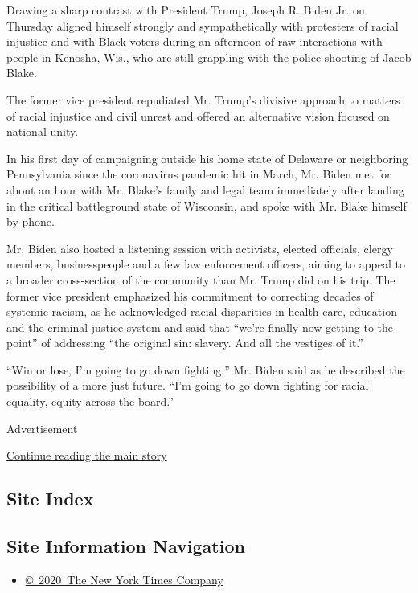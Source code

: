 Drawing a sharp contrast with President Trump, Joseph R. Biden Jr. on
Thursday aligned himself strongly and sympathetically with protesters of
racial injustice and with Black voters during an afternoon of raw
interactions with people in Kenosha, Wis., who are still grappling with
the police shooting of Jacob Blake.

The former vice president repudiated Mr. Trump's divisive approach to
matters of racial injustice and civil unrest and offered an alternative
vision focused on national unity.

In his first day of campaigning outside his home state of Delaware or
neighboring Pennsylvania since the coronavirus pandemic hit in March,
Mr. Biden met for about an hour with Mr. Blake's family and legal team
immediately after landing in the critical battleground state of
Wisconsin, and spoke with Mr. Blake himself by phone.

Mr. Biden also hosted a listening session with activists, elected
officials, clergy members, businesspeople and a few law enforcement
officers, aiming to appeal to a broader cross-section of the community
than Mr. Trump did on his trip. The former vice president emphasized his
commitment to correcting decades of systemic racism, as he acknowledged
racial disparities in health care, education and the criminal justice
system and said that ``we're finally now getting to the point'' of
addressing ``the original sin: slavery. And all the vestiges of it.''

``Win or lose, I'm going to go down fighting,'' Mr. Biden said as he
described the possibility of a more just future. ``I'm going to go down
fighting for racial equality, equity across the board.''

Advertisement

\protect\hyperlink{after-bottom}{Continue reading the main story}

\hypertarget{site-index}{%
\subsection{Site Index}\label{site-index}}

\hypertarget{site-information-navigation}{%
\subsection{Site Information
Navigation}\label{site-information-navigation}}

\begin{itemize}
\tightlist
\item
  \href{https://help.nytimes3xbfgragh.onion/hc/en-us/articles/115014792127-Copyright-notice}{©~2020~The
  New York Times Company}
\end{itemize}


